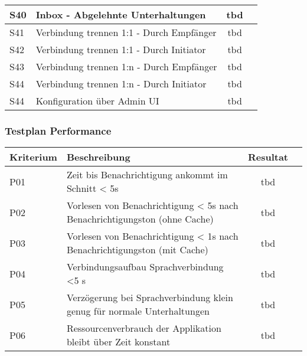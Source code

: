 \begin{table}[h]
\begin{tabular}{|l|p{11cm}|c|c|}
        \hline
        S40         & Inbox - Abgelehnte Unterhaltungen & tbd\\
        \hline
        S41         & Verbindung trennen 1:1 - Durch Empfänger & tbd\\
        \hline
        S42         & Verbindung trennen 1:1 - Durch Initiator & tbd\\
        \hline
        S43         & Verbindung trennen 1:n - Durch Empfänger & tbd\\
        \hline
        S44         & Verbindung trennen 1:n - Durch Initiator & tbd\\
        \hline
        S44         & Konfiguration über Admin UI & tbd\\
        \hline
    \end{tabular}\label{tab:testplan_gegensprechanlage}
\end{table}
\clearpage

\subsubsection{Testplan Performance}

\begin{table}[h]
    \centering
    \begin{tabular}{|l|p{11cm}|c|c|}
        \hline
        \textbf{Kriterium} & \textbf{Beschreibung}                                                                                                                                  & \textbf{Resultat} \\
        \hline
        P01         & Zeit bis Benachrichtigung ankommt im Schnitt < 5s & tbd\\
        \hline
        P02         & Vorlesen von Benachrichtigung < 5s nach Benachrichtigungston (ohne Cache) & tbd\\
        \hline
        P03         & Vorlesen von Benachrichtigung < 1s nach Benachrichtigungston (mit Cache) & tbd\\
        \hline
        P04         & Verbindungsaufbau Sprachverbindung <5 s  & tbd\\
        \hline
        P05         & Verzögerung bei Sprachverbindung klein genug für normale Unterhaltungen & tbd\\
        \hline
        P06         & Ressourcenverbrauch der Applikation bleibt über Zeit konstant & tbd\\
        \hline
    \end{tabular}\label{tab:testplan_performance}
\end{table}
\clearpage
